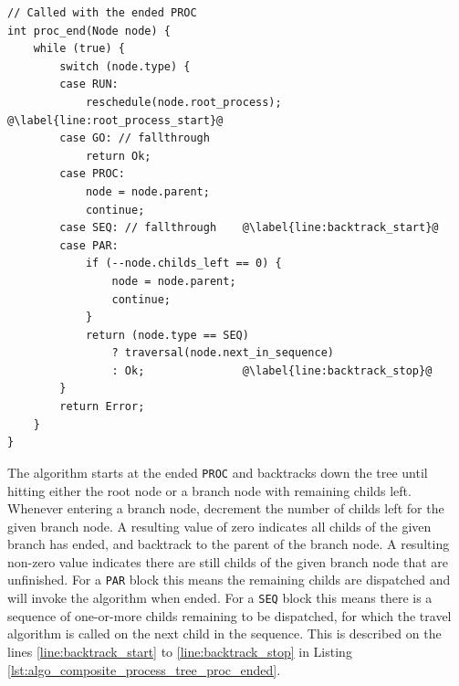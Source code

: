 
\begin{lstlisting}[style=CustomC,caption={Pseudo code for the composite process tree \texttt{PROC} ended algorithm},label={lst:algo_composite_process_tree_proc_ended}]
// Called with the ended PROC
int proc_end(Node node) {
	while (true) {
		switch (node.type) {
		case RUN:                           
			reschedule(node.root_process);  @\label{line:root_process_start}@
		case GO: // fallthrough
			return Ok;
		case PROC:
			node = node.parent;
			continue;
		case SEQ: // fallthrough    @\label{line:backtrack_start}@
		case PAR:
			if (--node.childs_left == 0) {
				node = node.parent;
				continue;
			}
			return (node.type == SEQ)
				? traversal(node.next_in_sequence)
				: Ok;               @\label{line:backtrack_stop}@
		}
		return Error;
	}
}
\end{lstlisting}

The algorithm starts at the ended \texttt{PROC} and backtracks down the tree until hitting either the root node or a branch node with remaining childs left. Whenever entering a branch node, decrement the number of childs left for the given branch node. A resulting value of zero indicates all childs of the given branch has ended, and backtrack to the parent of the branch node. A resulting non\hyp{}zero value indicates there are still childs of the given branch node that are unfinished. For a \texttt{PAR} block this means the remaining childs are dispatched and will invoke the algorithm when ended. For a \texttt{SEQ} block this means there is a sequence of one\hyp{}or\hyp{}more childs remaining to be dispatched, for which the travel algorithm is called on the next child in the sequence. This is described on the lines \ref{line:backtrack_start} to \ref{line:backtrack_stop} in Listing \ref{lst:algo_composite_process_tree_proc_ended}.

